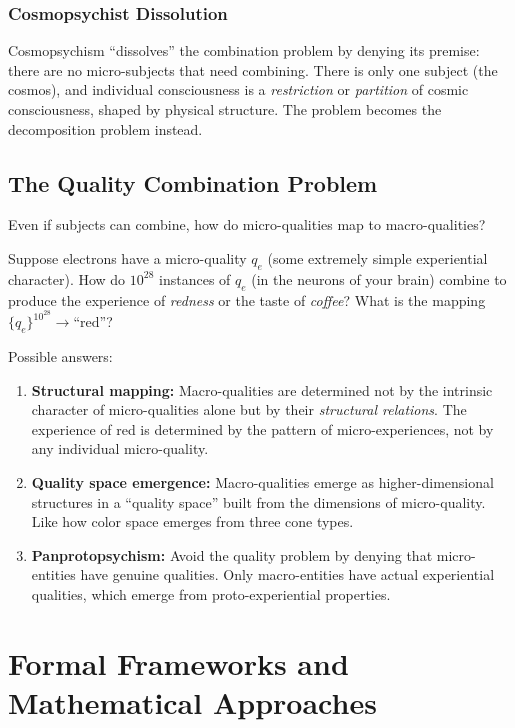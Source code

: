 \documentclass[11pt,a4paper]{report}
\begin{document}
\subsection{Cosmopsychist Dissolution}

Cosmopsychism ``dissolves'' the combination problem by denying its premise: there are no micro-subjects that need combining. There is only one subject (the cosmos), and individual consciousness is a \emph{restriction} or \emph{partition} of cosmic consciousness, shaped by physical structure. The problem becomes the decomposition problem instead.

\section{The Quality Combination Problem}

Even if subjects can combine, how do micro-qualities map to macro-qualities?

\begin{examplebox}
Suppose electrons have a micro-quality $q_e$ (some extremely simple experiential character). How do $10^{28}$ instances of $q_e$ (in the neurons of your brain) combine to produce the experience of \emph{redness} or the taste of \emph{coffee}? What is the mapping $\{q_e\}^{10^{28}} \to \text{``red''}$?
\end{examplebox}

Possible answers:
\begin{enumerate}[leftmargin=2em]
  \item \textbf{Structural mapping:} Macro-qualities are determined not by the intrinsic character of micro-qualities alone but by their \emph{structural relations}. The experience of red is determined by the pattern of micro-experiences, not by any individual micro-quality.
  \item \textbf{Quality space emergence:} Macro-qualities emerge as higher-dimensional structures in a ``quality space'' built from the dimensions of micro-quality. Like how color space emerges from three cone types.
  \item \textbf{Panprotopsychism:} Avoid the quality problem by denying that micro-entities have genuine qualities. Only macro-entities have actual experiential qualities, which emerge from proto-experiential properties.
\end{enumerate}


\chapter{Formal Frameworks and Mathematical Approaches}
\end{document}
